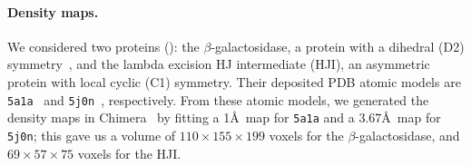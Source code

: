 \paragraph{Density maps.}
We considered two proteins (): the $\beta$-galactosidase, a protein with a dihedral (D2) symmetry~\cite{noauthor_d2sym_nodate}, and the lambda excision HJ intermediate (HJI), an asymmetric protein with local cyclic (C1) symmetry.
Their deposited PDB atomic models are \texttt{5a1a}~\cite{bartesaghi2015betagal} and \texttt{5j0n}~\cite{laxmikanthan2016structure}, respectively.
From these atomic models, we generated the density maps in Chimera~\cite{pettersen2004ucsf} by fitting a 1\AA\ map for \texttt{5a1a} and a 3.67\AA\ map for \texttt{5j0n}; this gave us a volume of $110 \times 155 \times 199$ voxels for the $\beta$-galactosidase, and $69 \times 57 \times 75$ voxels for the HJI\@.

